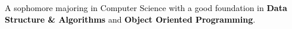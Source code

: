 \documentclass[10pt,a4paper,ragged2e,withhyper]{altacv}
\begin{document}
\begin{paracol}{2}
        
        
        
        
        \newpage
        
        \switchcolumn
        
            \textcolor{black}{A sophomore majoring in Computer Science with a good foundation in \textbf{Data Structure \& Algorithms} and \textbf{Object Oriented Programming}.}{}
            
        
            

\end{paracol}
\end{document}
